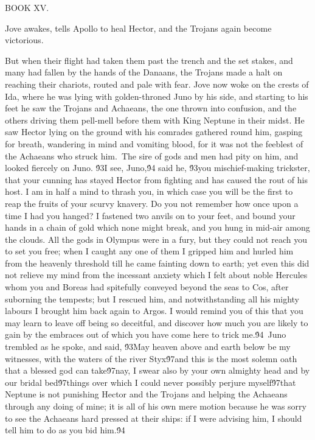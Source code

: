 {  BOOK XV.\
\pard{}\qj{}

  Jove awakes, tells Apollo to heal Hector, and the Trojans again become victorious.\
\pard{}\qj{}

  But when their flight had taken them past the trench and the set stakes, and many had fallen by the hands of the Danaans, the Trojans made a halt on reaching their chariots, routed and pale with fear. Jove now woke on the crests of Ida, where he was lying with golden-throned Juno by his side, and starting to his feet he saw the Trojans and Achaeans, the one thrown into confusion, and the others driving them pell-mell before them with King Neptune in their midst. He saw Hector lying on the ground with his comrades gathered round him, gasping for breath, wandering in mind and vomiting blood, for it was not the feeblest of the Achaeans who struck him.\
The sire of gods and men had pity on him, and looked fiercely on Juno. \'93I see, Juno,\'94 said he, \'93you mischief-making trickster, that your cunning has stayed Hector from fighting and has caused the rout of his host. I am in half a mind to thrash you, in which case you will be the first to reap the fruits of your scurvy knavery. Do you not remember how once upon a time I had you hanged? I fastened two anvils on to your feet, and bound your hands in a chain of gold which none might break, and you hung in mid-air among the clouds. All the gods in Olympus were in a fury, but they could not reach you to set you free; when I caught any one of them I gripped him and hurled him from the heavenly threshold till he came fainting down to earth; yet even this did not relieve my mind from the incessant anxiety which I felt about noble Hercules whom you and Boreas had spitefully conveyed beyond the seas to Cos, after suborning the tempests; but I rescued him, and notwithstanding all his mighty labours I brought him back again to Argos. I would remind you of this that you may learn to leave off being so deceitful, and discover how much you are likely to gain by the embraces out of which you have come here to trick me.\'94\
Juno trembled as he spoke, and said, \'93May heaven above and earth below be my witnesses, with the waters of the river Styx\'97and this is the most solemn oath that a blessed god can take\'97nay, I swear also by your own almighty head and by our bridal bed\'97things over which I could never possibly perjure myself\'97that Neptune is not punishing Hector and the Trojans and helping the Achaeans through any doing of mine; it is all of his own mere motion because he was sorry to see the Achaeans hard pressed at their ships: if I were advising him, I should tell him to do as you bid him.\'94\
}
